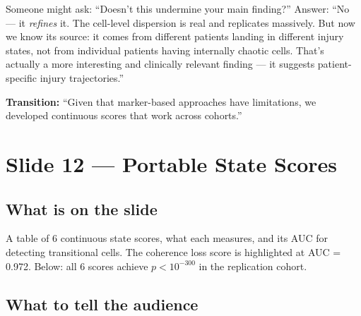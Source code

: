 \documentclass[11pt]{article}
\begin{document}
\begin{pitfall}
Someone might ask: ``Doesn't this undermine your main finding?'' Answer: ``No --- it \emph{refines} it. The cell-level dispersion is real and replicates massively. But now we know its source: it comes from different patients landing in different injury states, not from individual patients having internally chaotic cells. That's actually a more interesting and clinically relevant finding --- it suggests patient-specific injury trajectories.''
\end{pitfall}

\textbf{Transition:} ``Given that marker-based approaches have limitations, we developed continuous scores that work across cohorts.''


\section{Slide 12 --- Portable State Scores}

\subsection{What is on the slide}

A table of 6 continuous state scores, what each measures, and its AUC for detecting transitional cells. The coherence loss score is highlighted at AUC = 0.972. Below: all 6 scores achieve $p < 10^{-300}$ in the replication cohort.

\subsection{What to tell the audience}
\end{document}
